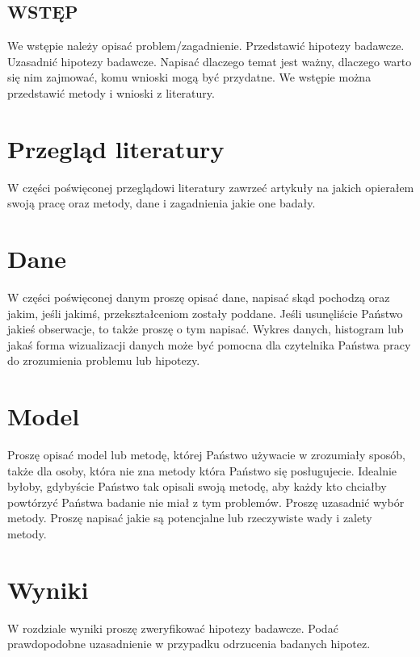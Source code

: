 \documentclass[12pt]{article}
\begin{document}



\tableofcontents

\newpage


\subsection*{WSTĘP}
We wstępie należy opisać problem/zagadnienie. Przedstawić hipotezy badawcze. Uzasadnić hipotezy badawcze. Napisać dlaczego temat jest ważny, dlaczego warto się nim zajmować, komu wnioski mogą być przydatne. We wstępie można przedstawić metody i wnioski z literatury.

\newpage 

\section{Przegląd literatury}
W części poświęconej przeglądowi literatury zawrzeć artykuły na jakich opierałem swoją pracę oraz metody, dane i zagadnienia jakie one badały.

\section{Dane}
W części poświęconej danym proszę opisać dane, napisać skąd pochodzą oraz jakim, jeśli jakimś, przekształceniom zostały poddane. Jeśli usunęliście Państwo jakieś obserwacje, to także proszę o tym napisać. Wykres danych, histogram lub jakaś forma wizualizacji danych może być pomocna dla czytelnika Państwa pracy do zrozumienia problemu lub hipotezy.

\section{Model}
Proszę opisać model lub metodę, której Państwo używacie w zrozumiały sposób, także dla osoby, która nie zna metody która Państwo się posługujecie. Idealnie byłoby, gdybyście Państwo tak opisali swoją metodę, aby każdy kto chciałby powtórzyć Państwa badanie nie miał z tym problemów. Proszę uzasadnić wybór metody. Proszę napisać jakie są potencjalne lub rzeczywiste wady i zalety metody.

\section{Wyniki}
W rozdziale wyniki proszę zweryfikować hipotezy badawcze. Podać prawdopodobne uzasadnienie w przypadku odrzucenia badanych hipotez.
\end{document}
